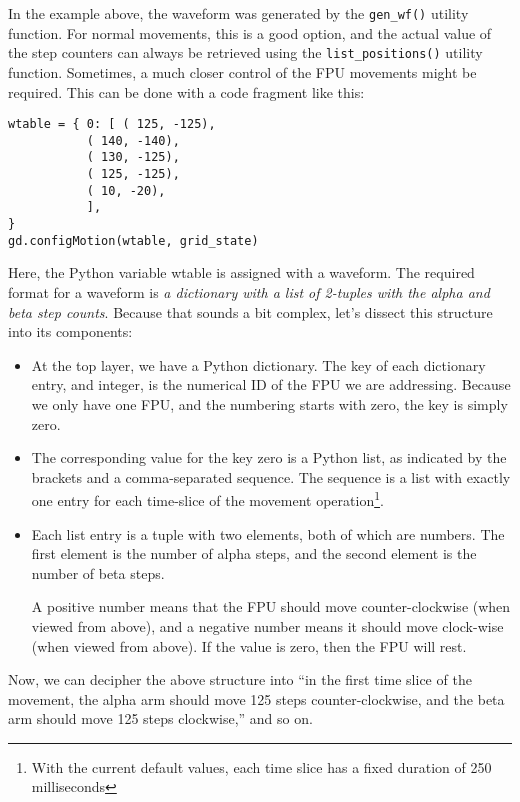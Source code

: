 \documentclass{scrartcl}[12pt,a4paper]
\begin{document}
In the example above, the waveform was generated by the
\texttt{gen\_wf()} utility function.  For normal movements, this is a
good option, and the actual value of the step counters can always be
retrieved using the \texttt{list\_positions()} utility
function. Sometimes, a much closer control of the FPU movements might
be required. This can be done with a code fragment like this:

\begin{verbatim}
wtable = { 0: [ ( 125, -125),
           ( 140, -140),
           ( 130, -125),
           ( 125, -125),
           ( 10, -20),
           ],
}
gd.configMotion(wtable, grid_state)
\end{verbatim}

Here, the Python variable wtable is assigned with
a waveform. The required format for a waveform
is \emph{a dictionary with a list of 2-tuples
  with the alpha and beta step counts}. Because
that sounds a bit complex, let's dissect this
structure into its components:

\begin{itemize}
  
\item At the top layer, we have a Python dictionary.  The key of each
  dictionary entry, and integer, is the numerical ID of the FPU we are
  addressing.  Because we only have one FPU, and the numbering starts
  with zero, the key is simply zero.

\item The corresponding value for the key zero is a Python list, as
  indicated by the brackets and a comma-separated sequence. The
  sequence is a list with exactly one entry for each time-slice of the
  movement operation\footnote{With the current default values,
  each time slice has a fixed duration of 250 milliseconds}.

\item Each list entry is a tuple with two elements, both of which are
  numbers. The first element is the number of alpha steps, and the
  second element is the number of beta steps.

  A positive number means that the FPU should move counter-clockwise
  (when viewed from above), and a negative number means it should move
  clock-wise (when viewed from above). If the value is zero, then the
  FPU will rest.

\end{itemize}

Now, we can decipher the above structure into ``in the first time
slice of the movement, the alpha arm should move 125 steps
counter-clockwise, and the beta arm should move 125 steps
clockwise,'' and so on.
\end{document}
